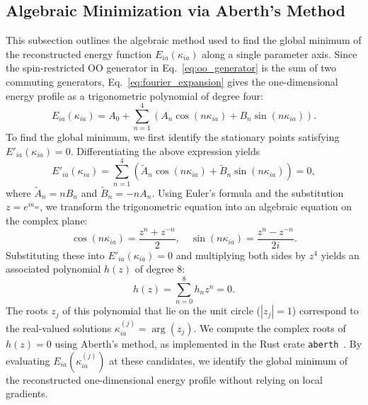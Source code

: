\documentclass[
 reprint,
 amsmath,amssymb,
 aps,
 physrev,
]{revtex4-2}
\begin{document}
\subsection{Algebraic Minimization via Aberth's Method}
\label{sec:aberth}
%
This subsection outlines the algebraic method used to find the global minimum of the reconstructed energy function \( E_{ia}(\kappa_{ia}) \) along a single parameter axis.
%
Since the spin-restricted OO generator in Eq.~\eqref{eq:oo_generator} is the sum of two commuting generators, Eq.~\eqref{eq:fourier_expansion} gives the one-dimensional energy profile as a trigonometric polynomial of degree four:
%
\begin{equation}
    \label{eq:oo_fourier_expansion}
    E_{ia}(\kappa_{ia}) = A_0 + \sum_{n=1}^{4} \left( {A}_n \cos(n\kappa_{ia}) + {B}_n \sin(n\kappa_{ia}) \right).
\end{equation}
%
To find the global minimum, we first identify the stationary points satisfying \( E'_{ia}(\kappa_{ia}) = 0 \). Differentiating the above expression yields
%
\begin{equation}
    E'_{ia}(\kappa_{ia}) = \sum_{n=1}^{4} \left( \tilde{A}_n \cos(n\kappa_{ia}) + \tilde{B}_n \sin(n\kappa_{ia}) \right) = 0,
\end{equation}
%
where \( \tilde{A}_n = n B_n \) and \( \tilde{B}_n = -n A_n \).
%
Using Euler's formula and the substitution \( z = e^{i\kappa_{ia}} \), we transform the trigonometric equation into an algebraic equation on the complex plane:
%
\begin{equation}
    \cos(n\kappa_{ia}) = \frac{z^n + z^{-n}}{2}, \quad \sin(n\kappa_{ia}) = \frac{z^n - z^{-n}}{2i}.
\end{equation}
%
Substituting these into \( E'_{ia}(\kappa_{ia}) = 0 \) and multiplying both sides by \( z^4 \) yields an associated polynomial \( h(z) \) of degree \( 8 \):
%
\begin{equation}
    \label{eq:polynomial}
    h(z) = \sum_{n=0}^{8} h_n z^n = 0.
\end{equation}
%
The roots \( z_j \) of this polynomial that lie on the unit circle (\( |z_j|=1 \)) correspond to the real-valued solutions \( \kappa_{ia}^{(j)} = \arg(z_j) \).
%
We compute the complex roots of \( h(z)=0 \) using Aberth's method, as implemented in the Rust crate \texttt{aberth}~\cite{aberth}.
%
By evaluating \( E_{ia}(\kappa_{ia}^{(j)}) \) at these candidates, we identify the global minimum of the reconstructed one-dimensional energy profile without relying on local gradients.
%
\end{document}
